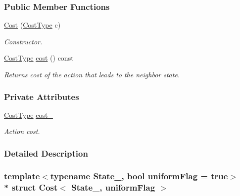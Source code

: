 \subsubsection*{Public Member Functions}
\begin{DoxyCompactItemize}
\item 
\hyperlink{structCost_a1189298e0b9484c97e9f87a933ec4453}{Cost} (\hyperlink{structCost_a22a996cdc08b472c30d1f410496e041a}{Cost\+Type} c)
\begin{DoxyCompactList}\small\item\em Constructor. \end{DoxyCompactList}\item 
\hyperlink{structCost_a22a996cdc08b472c30d1f410496e041a}{Cost\+Type} \hyperlink{structCost_a2fbde63c59806dc0ace63730733ffa5c}{cost} () const 
\begin{DoxyCompactList}\small\item\em Returns cost of the action that leads to the neighbor state. \end{DoxyCompactList}\end{DoxyCompactItemize}
\subsubsection*{Private Attributes}
\begin{DoxyCompactItemize}
\item 
\hyperlink{structCost_a22a996cdc08b472c30d1f410496e041a}{Cost\+Type} \hyperlink{structCost_a0a58d003eb999bfe0d661d4889f8421d}{cost\+\_\+}\hypertarget{structCost_a0a58d003eb999bfe0d661d4889f8421d}{}\label{structCost_a0a58d003eb999bfe0d661d4889f8421d}

\begin{DoxyCompactList}\small\item\em Action cost. \end{DoxyCompactList}\end{DoxyCompactItemize}


\subsubsection{Detailed Description}
\subsubsection*{template$<$typename State\+\_\+, bool uniform\+Flag = true$>$\\*
struct Cost$<$ State\+\_\+, uniform\+Flag $>$}

